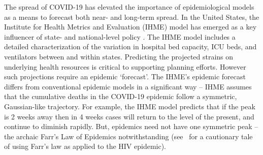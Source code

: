 The spread of COVID-19 has elevated the importance of epidemiological
models as a means to forecast both near- and long-term spread. 
In the United States, the Institute for Health Metrics and Evaluation (IHME)
model has emerged as a key influencer of state- and national-level
policy \citep{covid2020forecasting}.  
The IHME model includes a detailed characterization
of the variation in
hospital bed capacity, ICU beds, and ventilators between and within
states. Predicting the projected strains on underlying
health resources is critical to supporting planning efforts.
However such projections require
an epidemic `forecast'.  The IHME's epidemic forecast
differs from conventional
epidemic models in a significant way -- IHME assumes
that the cumulative deaths in the COVID-19 epidemic 
follow a symmetric, Gaussian-like trajectory. 
For example, the 
IHME model predicts that if the peak is 2 weeks away then in 4 weeks
cases will return to the level of the present, and continue
to diminish rapidly.  But, epidemics need not have one symmetric peak -- 
the archaic Farr's Law of Epidemics notwithstanding
(see~\citep{bregman1990farr} for a cautionary tale of using
Farr's law as applied to the HIV epidemic). 

